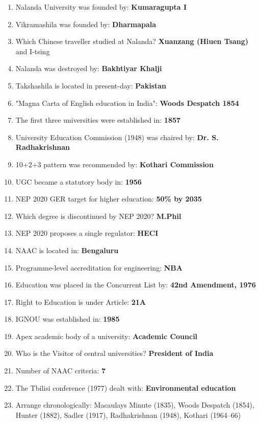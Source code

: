\begin{enumerate}
\def\labelenumi{\arabic{enumi}.}
\tightlist
\item
  Nalanda University was founded by: \textbf{Kumaragupta I}
\item
  Vikramashila was founded by: \textbf{Dharmapala}
\item
  Which Chinese traveller studied at Nalanda? \textbf{Xuanzang (Hiuen Tsang)} and I-tsing
\item
  Nalanda was destroyed by: \textbf{Bakhtiyar Khalji}
\item
  Takshashila is located in present-day: \textbf{Pakistan}
\item
  "Magna Carta of English education in India": \textbf{Wood\textquotesingle s Despatch 1854}
\item
  The first three universities were established in: \textbf{1857}
\item
  University Education Commission (1948) was chaired by: \textbf{Dr. S. Radhakrishnan}
\item
  10+2+3 pattern was recommended by: \textbf{Kothari Commission}
\item
  UGC became a statutory body in: \textbf{1956}
\item
  NEP 2020 GER target for higher education: \textbf{50\% by 2035}
\item
  Which degree is discontinued by NEP 2020? \textbf{M.Phil}
\item
  NEP 2020 proposes a single regulator: \textbf{HECI}
\item
  NAAC is located in: \textbf{Bengaluru}
\item
  Programme-level accreditation for engineering: \textbf{NBA}
\item
  Education was placed in the Concurrent List by: \textbf{42nd Amendment, 1976}
\item
  Right to Education is under Article: \textbf{21A}
\item
  IGNOU was established in: \textbf{1985}
\item
  Apex academic body of a university: \textbf{Academic Council}
\item
  Who is the Visitor of central universities? \textbf{President of India}
\item
  Number of NAAC criteria: \textbf{7}
\item
  The Tbilisi conference (1977) dealt with: \textbf{Environmental education}
\item
  Arrange chronologically: Macaulay\textquotesingle s Minute (1835), Wood\textquotesingle s Despatch (1854), Hunter (1882), Sadler (1917), Radhakrishnan (1948), Kothari (1964--66)
\end{enumerate}

